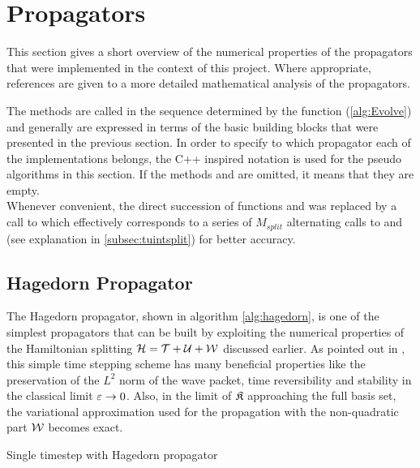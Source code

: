 \section{Propagators}
\label{sec:propagators}

This section gives a short overview of the numerical properties of the propagators that were implemented in the context of this project.
Where appropriate, references are given to a more detailed mathematical analysis of the propagators.
\par\medskip
The methods are called in the sequence determined by the  function (\ref{alg:Evolve}) and generally are expressed in terms of the basic building blocks that were presented in the previous section.
In order to specify to which propagator each of the implementations belongs, the C++ inspired notation  is used for the pseudo algorithms in this section.
If the methods  and  are omitted, it means that they are empty. \\
Whenever convenient, the direct succession of functions  and  was replaced by a call to  which effectively corresponds to a series of $M_{split}$ alternating calls to  and  (see explanation in \ref{subsec:tuintsplit}) for better accuracy.

\subsection{Hagedorn Propagator}
\label{sub:hagedorn_propagator}
%
The Hagedorn propagator, shown in algorithm \ref{alg:hagedorn}, is one of the simplest propagators that can be built by exploiting the numerical properties of the Hamiltonian splitting $\mathcal{H} = \mathcal{T} + \mathcal{U} + \mathcal{W}$ discussed earlier.
As pointed out in \cite{FGL_semiclassical_dynamics}, this simple time stepping scheme has many beneficial properties like the preservation of the $L^2$ norm of the wave packet, time reversibility and stability in the classical limit $\varepsilon \rightarrow 0$.
Also, in the limit of $\mathfrak{K}$ approaching the full basis set, the variational approximation used for the propagation with the non-quadratic part $\mathcal{W}$ becomes exact.
\begin{algorithm}[h]
	\caption{Single timestep with Hagedorn propagator}
	\label{alg:hagedorn}
	\begin{algorithmic}
	\State
		\State
			\State {}
			\State {}
			\State {}
			\State {}
		\State
		\EndProcedure
	\end{algorithmic}
\end{algorithm}


